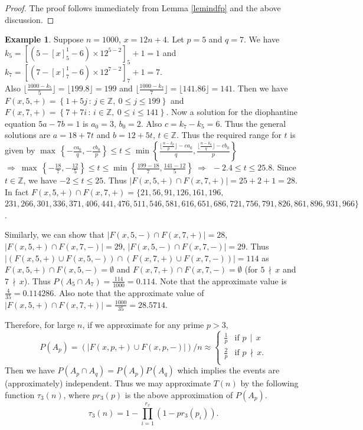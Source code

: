 \documentclass[11pt]{article}
\theoremstyle{definition}
\newtheorem{example}[theorem]{Example}
\theoremstyle{remark}
\numberwithin{equation}{section}
\newcommand{\Int}{\mathbb{Z}}
\newcommand{\set}[1]{\left\{#1\right\}}
\newcommand{\Set}[2]{\set{#1\, :\, #2}}
\newcommand{\Div}[2]{#1\,\mid\, #2}
\newcommand{\nDiv}[2]{#1\,\nmid\, #2}
\begin{document}
\begin{proof}
The proof follows immediately from Lemma \ref{lemindfp} and the above discussion.
\end{proof}

\begin{example}
Suppose $n=1000$, $x=12n+4$. Let $p=5$ and $q=7$. We have \\
$k_5=[(5-[x]_5^1-6)\times 12^{5-2}]_5+1=1$ and $k_7=[(7-[x]_7^1-6)\times 12^{7-2}]_7+1=7$. \\
Also $\lfloor \frac{1000-k_5}{5}\rfloor=\lfloor 199.8\rfloor = 199$ and $\lfloor \frac{1000-k_7}{7}\rfloor=\lfloor 141.86\rfloor = 141$. Then we have \\
$F(x,5,+)=\Set{1+5j}{j\in\Int,\ 0\leq j\leq 199}$ and $F(x,7,+)=\Set{7+7i}{i\in\Int,\ 0\leq i\leq 141}$. Now a solution for the diophantine equation $5a-7b=1$ is $a_0=3$, $b_0=2$. Also $c=k_7-k_5=6$. Thus the general solutions are $a=18+7t$ and $b=12+5t$, $t\in\Int$. Thus the required range for $t$ is given by
$\max\, \left\{-\frac{ca_0}{q},-\frac{cb_0}{p}\right\}\leq t\leq \min\left\{\frac{\lfloor \frac{n-k_p}{p}\rfloor -ca_0}{q}, \frac{\lfloor \frac{n-k_q}{q}\rfloor -cb_0}{p}\right\}$ 
$ \Longrightarrow\ \max\, \left\{-\frac{18}{7},-\frac{12}{5}\right\}\leq t\leq \min\left\{\frac{199 -18}{7}, \frac{141 -12}{5}\right\}\ \Longrightarrow\ \ -2.4\leq t \leq 25.8$.
Since $t\in\Int$, we have $-2\leq t\leq 25$. Thus $|F(x,5,+)\cap F(x,7,+)|=25+2+1=28$. In fact 
$F(x,5,+)\cap F(x,7,+)=\{21, 56, 91, 126, 161, 196,$\\ 
$231, 266, 301, 336, 371, 406, 441, 476, 511, 546, 581, 616, 651, 686, 721, 756, 791, 826, 861, 896, 931, 966\}$.

\vspace{1em}
\noindent
Similarly, we can show that $|F(x,5,-)\cap F(x,7,+)|=28$, $|F(x,5,+)\cap F(x,7,-)|=29$, $|F(x,5,-)\cap F(x,7,-)|=29$. Thus 
$|(F(x,5,+)\cup F(x,5,-))\cap (F(x,7,+)\cup F(x,7,-))|=114$ as $F(x,5,+)\cap F(x,5,-)=\emptyset$ and $F(x,7,+)\cap F(x,7,-)=\emptyset$ (for $\nDiv{5}{x}$ and $\nDiv{7}{x}$). Thus $P(A_5\cap A_7)=\frac{114}{1000}=0.114$. Note that the approximate value is $\frac{4}{35}=0.114286$. Also note that the approximate value of $|F(x,5,+)\cap F(x,7,+)|=\frac{1000}{35}=28.5714$.
\end{example}

\noindent
Therefore, for large $n$, if we approximate for any prime $p>3$,
$$P(A_p)=(|F(x,p,+)\cup F(x,p,-)|)/n\approx\left\{%
\begin{array}{ll}
\frac{1}{p} & \text{if } \Div{p}{x}\\
\frac{2}{p} & \text{if } \nDiv{p}{x}.\\
\end{array}\right.$$
Then we have $P(A_p\cap A_q)=P(A_p) P(A_q)$ which implies the events are (approximately) independent. Thus we may approximate $T(n)$ by the following function $\tau_3(n)$, where $pr_3(p)$ is the above approximation of $P(A_p)$.
\begin{equation}\label{eqnetaap}
\tau_3(n)=1-\prod\limits_{i=1}^{r_x} (1-pr_3(p_i)).
\end{equation}
\end{document}
